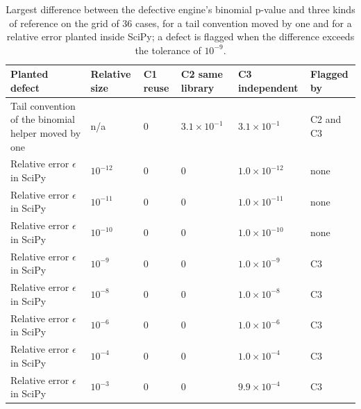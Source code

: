 \begin{table}[htbp]
\centering
\footnotesize
\setlength{\tabcolsep}{4pt}
\caption{Largest difference between the defective engine's binomial p-value and three kinds of reference on the grid of 36 cases, for a tail convention moved by one and for a relative error planted inside SciPy; a defect is flagged when the difference exceeds the tolerance of $10^{-9}$.}
\label{tab:routes-defects}
\begin{tabularx}{\textwidth}{@{}>{\raggedright\arraybackslash}X>{\raggedright\arraybackslash}p{1.6cm}>{\raggedright\arraybackslash}p{1.8cm}>{\raggedright\arraybackslash}p{2.1cm}>{\raggedright\arraybackslash}p{2.3cm}>{\raggedright\arraybackslash}p{2.2cm}@{}}
\toprule
Planted defect & Relative size & C1 reuse & C2 same library & C3 independent & Flagged by \\
\midrule
Tail convention of the binomial helper moved by one & n/a & $0$ & $3.1\times10^{-1}$ & $3.1\times10^{-1}$ & C2 and C3 \\
\relax Relative error $\epsilon$ in SciPy & $10^{-12}$ & $0$ & $0$ & $1.0\times10^{-12}$ & none \\
\relax Relative error $\epsilon$ in SciPy & $10^{-11}$ & $0$ & $0$ & $1.0\times10^{-11}$ & none \\
\relax Relative error $\epsilon$ in SciPy & $10^{-10}$ & $0$ & $0$ & $1.0\times10^{-10}$ & none \\
\relax Relative error $\epsilon$ in SciPy & $10^{-9}$ & $0$ & $0$ & $1.0\times10^{-9}$ & C3 \\
\relax Relative error $\epsilon$ in SciPy & $10^{-8}$ & $0$ & $0$ & $1.0\times10^{-8}$ & C3 \\
\relax Relative error $\epsilon$ in SciPy & $10^{-6}$ & $0$ & $0$ & $1.0\times10^{-6}$ & C3 \\
\relax Relative error $\epsilon$ in SciPy & $10^{-4}$ & $0$ & $0$ & $1.0\times10^{-4}$ & C3 \\
\relax Relative error $\epsilon$ in SciPy & $10^{-3}$ & $0$ & $0$ & $9.9\times10^{-4}$ & C3 \\
\bottomrule
\end{tabularx}
\end{table}
